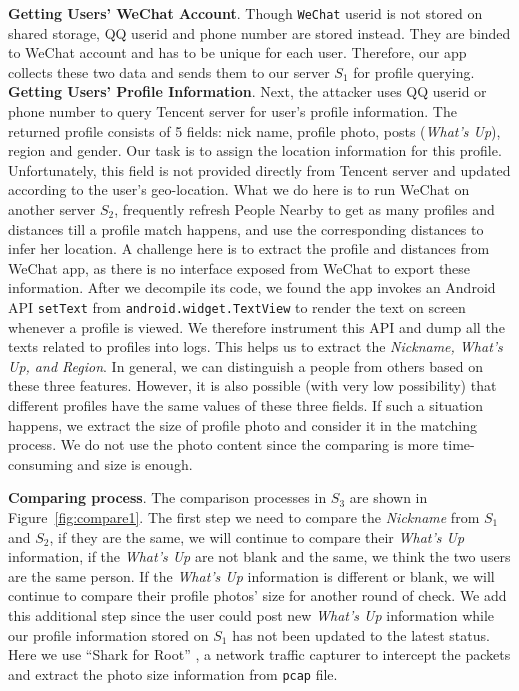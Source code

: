 \documentclass{sig-alternate}
\begin{document}
\vspace{2pt}\noindent\textbf{Getting Users' WeChat Account}.
Though \texttt{WeChat} userid is not stored on shared storage, QQ userid and phone number are stored instead. They are binded to WeChat account and has to be unique for each user. Therefore, our app collects these two data and sends them to our server $S_1$ for profile querying.
\vspace{2pt}\noindent\textbf{Getting Users' Profile Information}.
Next, the attacker uses QQ userid or phone number to query Tencent server for user's profile information. The returned profile consists of 5 fields: nick name, profile photo, posts (\textit{What's Up}), region and gender. Our task is to assign the location information for this profile. Unfortunately, this field is not provided directly from Tencent server and updated according to the user's geo-location. What we do here is to run WeChat on another server $S_2$, frequently refresh People Nearby to get as many profiles and distances till a profile match happens, and use the corresponding distances to infer her location. A challenge here is to extract the profile and distances from WeChat app, as there is no interface exposed from WeChat to export these information. After we decompile its code, we found the app invokes an Android API \texttt{setText} from \texttt{android.widget.TextView} to render the text on screen whenever a profile is viewed. We therefore instrument this API and dump all the texts related to profiles into logs. This helps us to extract the \textit{Nickname, What's Up, and Region}. In general, we can distinguish a people from others based on these three features. However, it is also possible (with very low possibility) that different profiles have the same values of these three fields. If such a situation happens, we extract the size of profile photo and consider it in the matching process. We do not use the photo content since the comparing is more time-consuming and size is enough.


\vspace{2pt}\noindent\textbf{Comparing process}.
The comparison processes in $S_3$ are shown in Figure~\ref{fig:compare1}. The first step we need to compare the \textit{Nickname} from $S_1$ and $S_2$, if they are the same, we will continue to compare their \textit{What's Up} information, if the \textit{What's Up} are not blank and the same, we think the two users are the same person. If the \textit{What's Up} information is different or blank, we will continue to compare their profile photos' size for another round of check. We add this additional step since the user could post new \textit{What's Up} information while our profile information stored on $S_1$ has not been updated to the latest status. Here we use ``Shark for Root'' \cite{wireshark}, a network traffic capturer to intercept the packets and extract the photo size information from \texttt{pcap} file.
\end{document}
